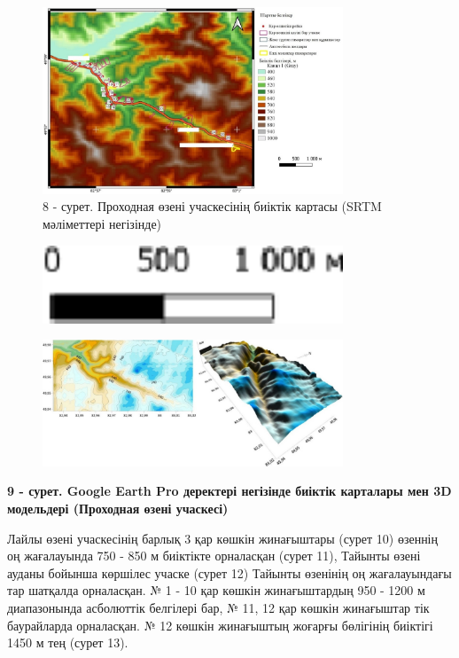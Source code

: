\begin{figure}[H]
	\centering
	\includegraphics[width=0.8\textwidth]{media/ict2/image211}
	\caption*{8 - сурет. Проходная өзені учаскесінің биіктік картасы (SRTM мәліметтері негізінде)}
\end{figure}

\begin{figure}[H]
	\centering
	\includegraphics[width=0.8\textwidth]{media/ict2/image209}
	\caption*{}
\end{figure}

\begin{figure}[H]
	\centering
	\includegraphics[width=0.8\textwidth]{media/ict2/image212}
	\caption*{}
\end{figure}


{\bfseries 9 - сурет. Google Earth Pro деректері негізінде биіктік карталары мен 3D модельдері (Проходная өзені учаскесі)}

Лайлы өзені учаскесінің барлық 3 қар көшкін жинағыштары (сурет 10)
өзеннің оң жағалауында 750 - 850 м биіктікте орналасқан (сурет 11),
Тайынты өзені ауданы бойынша көршілес учаске (сурет 12) Тайынты өзенінің
оң жағалауындағы тар шатқалда орналасқан. № 1 - 10 қар көшкін
жинағыштардың 950 - 1200 м диапазонында асболюттік белгілері бар, № 11,
12 қар көшкін жинағыштар тік баурайларда орналасқан. № 12 көшкін
жинағыштың жоғарғы бөлігінің биіктігі 1450 м тең (сурет 13).


